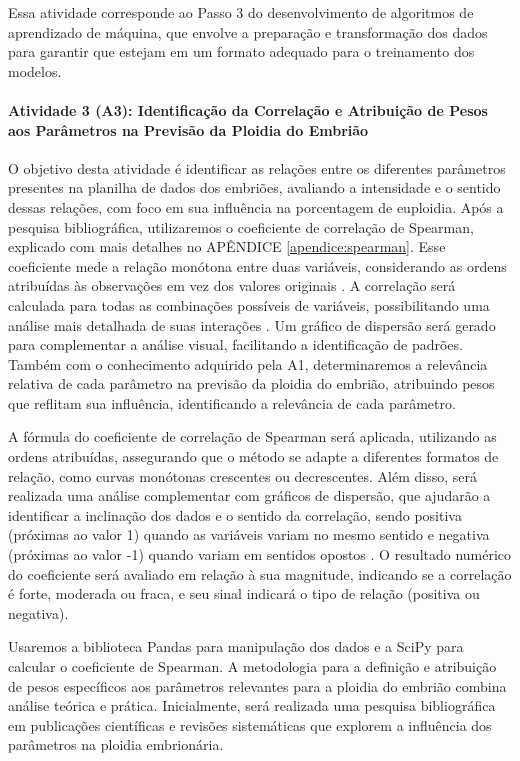 Essa atividade corresponde ao Passo 3 do desenvolvimento de algoritmos de aprendizado de máquina, que envolve a preparação e transformação dos dados para garantir que estejam em um formato adequado para o treinamento dos modelos.

\paragraph{\textbf{Atividade 3 (A3):} Identificação da Correlação e Atribuição de Pesos aos Parâmetros na Previsão da Ploidia do Embrião}

O objetivo desta atividade é identificar as relações entre os diferentes parâmetros presentes na planilha de dados dos embriões, avaliando a intensidade e o sentido dessas relações, com foco em sua influência na porcentagem de euploidia. Após a pesquisa bibliográfica, utilizaremos o coeficiente de correlação de Spearman, explicado com mais detalhes no APÊNDICE \ref{apendice:spearman}. Esse coeficiente mede a relação monótona entre duas variáveis, considerando as ordens atribuídas às observações em vez dos valores originais \cite{sousa2019}. A correlação será calculada para todas as combinações possíveis de variáveis, possibilitando uma análise mais detalhada de suas interações \cite{sousa2019}. Um gráfico de dispersão será gerado para complementar a análise visual, facilitando a identificação de padrões. Também com o conhecimento adquirido pela A1, determinaremos a relevância relativa de cada parâmetro na previsão da ploidia do embrião, atribuindo pesos que reflitam sua influência, identificando a relevância de cada parâmetro.

A fórmula do coeficiente de correlação de Spearman será aplicada, utilizando as ordens atribuídas, assegurando que o método se adapte a diferentes formatos de relação, como curvas monótonas crescentes ou decrescentes. Além disso, será realizada uma análise complementar com gráficos de dispersão, que ajudarão a identificar a inclinação dos dados e o sentido da correlação, sendo positiva (próximas ao valor 1) quando as variáveis variam no mesmo sentido e negativa (próximas ao valor -1) quando variam em sentidos opostos \cite{sousa2019}. O resultado numérico do coeficiente será avaliado em relação à sua magnitude, indicando se a correlação é forte, moderada ou fraca, e seu sinal indicará o tipo de relação (positiva ou negativa). 

Usaremos a biblioteca Pandas para manipulação dos dados e a SciPy para calcular o coeficiente de Spearman. A metodologia para a definição e atribuição de pesos específicos aos parâmetros relevantes para a ploidia do embrião combina análise teórica e prática. Inicialmente, será realizada uma pesquisa bibliográfica em publicações científicas e revisões sistemáticas que explorem a influência dos parâmetros na ploidia embrionária.

